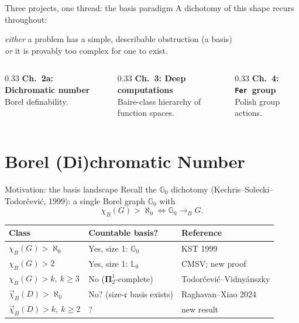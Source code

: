 \documentclass[aspectratio=169]{beamer}
\newcommand{\tFer}{\texttt{Fer}\ }
\begin{document}
\begin{frame}{Three projects, one thread: the basis paradigm}
  A dichotomy of this shape recurs throughout:
  \begin{center}
    \emph{either} a problem has a simple, describable obstruction (a \alert{basis}) \\
    \emph{or} it is provably too complex for one to exist.
  \end{center}
  \vspace{0.5em}
  \begin{columns}[T]
    \begin{column}{0.33\textwidth}
      \textbf{Ch.~2a: Dichromatic number}\\[2pt]
      \small Borel definability.
    \end{column}
    \begin{column}{0.33\textwidth}
      \textbf{Ch.~3: Deep computations}\\[2pt]
      \small Baire-class hierarchy of function spaces.
    \end{column}
    \begin{column}{0.33\textwidth}
      \textbf{Ch.~4: \tFer group}\\[2pt]
      \small Polish group actions.
    \end{column}
  \end{columns}
\end{frame}

\section{Borel (Di)chromatic Number}

\begin{frame}{Motivation: the basis landscape}
  Recall the $\mathbb G_0$ dichotomy (Kechris--Solecki--Todor\v{c}evi\'c, 1999): a single Borel graph $\mathbb G_0$ with
  $$\chi_B(G) > \aleph_0 \iff \mathbb G_0 \to_B G.$$
  \begin{center}
  \small
  \begin{tabular}{lll}
    \toprule
    \textbf{Class} & \textbf{Countable basis?} & \textbf{Reference} \\
    \midrule
    $\chi_B(G) > \aleph_0$ & Yes, size 1: $\mathbb G_0$ & KST 1999 \\
    $\chi_B(G) > 2$ & Yes, size 1: $\mathbb L_0$ & CMSV; \alert{new proof} \\
    $\chi_B(G) > k,\ k\geq 3$ & No ($\mathbf\Pi^1_2$-complete) & Todor\v{c}evi\'c--Vidny\'anszky \\
    \midrule
    $\vec\chi_B(D) > \aleph_0$ & \alert{No?} (size-$\mathfrak c$ basis exists) & Raghavan--Xiao 2024 \\
    $\vec\chi_B(D) > k,\ k\geq 2$ & \alert{?} & \alert{new result}\\
    \bottomrule
  \end{tabular}
  \end{center}
\end{frame}
\end{document}
